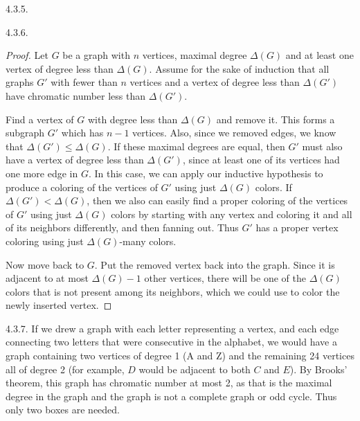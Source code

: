 \begin {itemize}
\begin{ans}{4.3.5.}
		\begin{center}
		\end{center}
	
\end{ans}
\begin{ans}{4.3.6.}
		\begin{proof}
		Let $G$ be a graph with $n$ vertices, maximal degree $\Delta(G)$ and at least one vertex of degree less than $\Delta(G)$.  Assume for the sake of induction that all graphs $G'$ with fewer than $n$ vertices and a vertex of degree less than $\Delta(G')$ have chromatic number less than $\Delta(G')$.

		Find a vertex of $G$ with degree less than $\Delta(G)$ and remove it.  This forms a subgraph $G'$ which has $n-1$ vertices.  Also, since we removed edges, we know that $\Delta(G') \le \Delta(G)$.  If these maximal degrees are equal, then $G'$ must also have a vertex of degree less than $\Delta(G')$, since at least one of its vertices had one more edge in $G$.  In this case, we can apply our inductive hypothesis to produce a coloring of the vertices of $G'$ using just $\Delta(G)$ colors.  If $\Delta(G') < \Delta(G)$, then we also can easily find a proper coloring of the vertices of $G'$ using just $\Delta(G)$ colors by starting with any vertex and coloring it and all of its neighbors differently, and then fanning out.  Thus $G'$ has a proper vertex coloring using just $\Delta(G)$-many colors.

		Now move back to $G$.  Put the removed vertex back into the graph.  Since it is adjacent to at most $\Delta(G) - 1$ other vertices, there will be one of the $\Delta(G)$ colors that is not present among its neighbors, which we could use to color the newly inserted vertex.
		\end{proof}
	
\end{ans}
\begin{ans}{4.3.7.}
		If we drew a graph with each letter representing a vertex, and each edge connecting two letters that were consecutive in the alphabet, we would have a graph containing two vertices of degree 1 (A and Z) and the remaining 24 vertices all of degree 2 (for example, $D$ would be adjacent to both $C$ and $E$).  By Brooks' theorem, this graph has chromatic number at most 2, as that is the maximal degree in the graph and the graph is not a complete graph or odd cycle.  Thus only two boxes are needed.
	

\end{ans}
\end{itemize}
